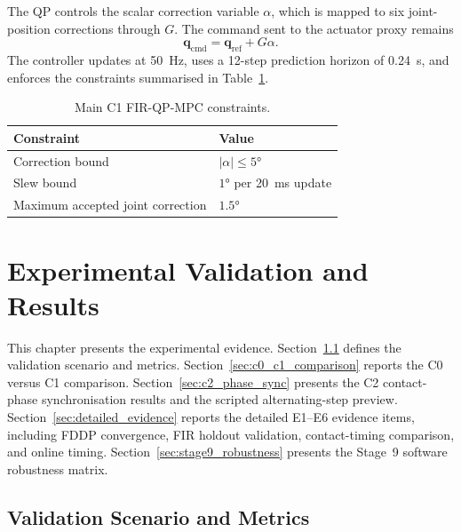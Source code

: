 \documentclass[12pt,a4paper]{report}
\begin{document}
The QP controls the scalar correction variable $\alpha$, which is mapped to six joint-position corrections through $G$. The command sent to the actuator proxy remains
\begin{equation}
    \mathbf{q}_{\mathrm{cmd}} = \mathbf{q}_{\mathrm{ref}} + G\alpha.
\end{equation}
The controller updates at \SI{50}{\hertz}, uses a 12-step prediction horizon of \SI{0.24}{\second}, and enforces the constraints summarised in Table~\ref{tab:qp_constraints}.
 
\begin{table}[htbp]
\centering
\caption{Main C1 FIR-QP-MPC constraints.}
\label{tab:qp_constraints}
\begin{tabular}{@{}ll@{}}
\toprule
Constraint & Value \\
\midrule
Correction bound & $|\alpha| \leq \ang{5}$ \\
Slew bound & $\ang{1}$ per \SI{20}{\milli\second} update \\
Maximum accepted joint correction & $\ang{1.5}$ \\
\bottomrule
\end{tabular}
\end{table}
 
\chapter{Experimental Validation and Results}\label{ch:experiments}
 
This chapter presents the experimental evidence. Section~\ref{sec:validation_scenario} defines the validation scenario and metrics. Section~\ref{sec:c0_c1_comparison} reports the C0 versus C1 comparison. Section~\ref{sec:c2_phase_sync} presents the C2 contact-phase synchronisation results and the scripted alternating-step preview. Section~\ref{sec:detailed_evidence} reports the detailed E1--E6 evidence items, including FDDP convergence, FIR holdout validation, contact-timing comparison, and online timing. Section~\ref{sec:stage9_robustness} presents the Stage~9 software robustness matrix.
 
\section{Validation Scenario and Metrics}\label{sec:validation_scenario}
 
\end{document}

